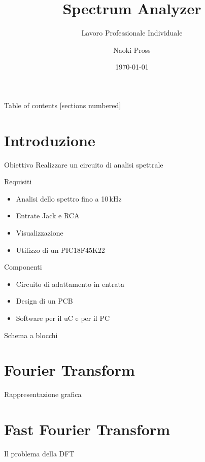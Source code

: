 \documentclass[10pt, handout]{beamer}
\title{Spectrum Analyzer}
\subtitle{Lavoro Professionale Individuale}
\date{\today}
\author{Naoki Pross}
\institute{SAM Bellinzona}
\begin{document}
\maketitle

\begin{frame}{Table of contents}
    [sections numbered]
    \tableofcontents[hideallsubsections]
\end{frame}

\section{Introduzione}
\begin{frame}{Obiettivo}
    Realizzare un circuito di analisi spettrale
    \begin{block}{Requisiti}
    \begin{itemize}
        \item Analisi dello spettro fino a 10\,kHz
        \item Entrate Jack e RCA
        \item Visualizzazione 
        \item Utilizzo di un PIC18F45K22
    \end{itemize}
    \end{block}
    
    \pause
    \begin{block}{Componenti}
    \begin{itemize}
        \item Circuito di adattamento in entrata
        \item Design di un PCB
        \item Software per il uC e per il PC
    \end{itemize}
    \end{block}
\end{frame}

\begin{frame}{Schema a blocchi}
\end{frame}

\section{Fourier Transform}
\begin{frame}{Rappresentazione grafica}
\end{frame}

\section{Fast Fourier Transform}
\begin{frame}{Il problema della DFT}
\end{frame}
\end{document}
